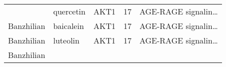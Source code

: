 \documentclass[
]{article}
\begin{document}
\begin{longtable}[]{@{}lllll@{}}
\begin{minipage}[t]{0.17\columnwidth}
\end{minipage} & \begin{minipage}[t]{0.16\columnwidth}\raggedright
quercetin\strut
\end{minipage} & \begin{minipage}[t]{0.12\columnwidth}\raggedright
AKT1\strut
\end{minipage} & \begin{minipage}[t]{0.19\columnwidth}\raggedright
17\strut
\end{minipage} & \begin{minipage}[t]{0.21\columnwidth}\raggedright
AGE-RAGE signalin\ldots{}\strut
\end{minipage}\tabularnewline
\begin{minipage}[t]{0.17\columnwidth}\raggedright
Banzhilian\strut
\end{minipage} & \begin{minipage}[t]{0.16\columnwidth}\raggedright
baicalein\strut
\end{minipage} & \begin{minipage}[t]{0.12\columnwidth}\raggedright
AKT1\strut
\end{minipage} & \begin{minipage}[t]{0.19\columnwidth}\raggedright
17\strut
\end{minipage} & \begin{minipage}[t]{0.21\columnwidth}\raggedright
AGE-RAGE signalin\ldots{}\strut
\end{minipage}\tabularnewline
\begin{minipage}[t]{0.17\columnwidth}\raggedright
Banzhilian\strut
\end{minipage} & \begin{minipage}[t]{0.16\columnwidth}\raggedright
luteolin\strut
\end{minipage} & \begin{minipage}[t]{0.12\columnwidth}\raggedright
AKT1\strut
\end{minipage} & \begin{minipage}[t]{0.19\columnwidth}\raggedright
17\strut
\end{minipage} & \begin{minipage}[t]{0.21\columnwidth}\raggedright
AGE-RAGE signalin\ldots{}\strut
\end{minipage}\tabularnewline
\begin{minipage}[t]{0.17\columnwidth}\raggedright
Banzhilian\strut
\end{minipage} & \begin{minipage}[t]{0.16\columnwidth}\raggedright

\end{minipage}
\end{longtable}
\end{document}
